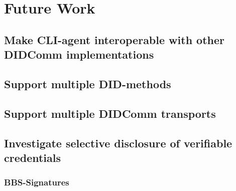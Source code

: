 \chapter{Future Work}

\section{Make CLI-agent interoperable with other DIDComm implementations}

\section{Support multiple DID-methods}

\section{Support multiple DIDComm transports}

\section{Investigate selective disclosure of verifiable credentials}

\subsection{BBS-Signatures}
